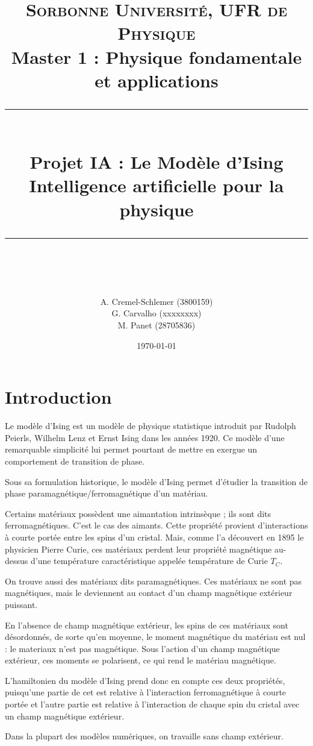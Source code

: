 \documentclass[11pt]{scrartcl} %
\title{	
	\normalfont\normalsize
	\large\textsc{Sorbonne Université, UFR de Physique}\\ %
	\vspace{2pt} %
	\normalsize Master 1 : Physique fondamentale et applications\\
	\vspace{25pt} %
	\rule{\linewidth}{0.5pt}\\ %
	\vspace{20pt} %
	{\huge Projet IA : Le Modèle d'Ising}\\ %
	\vspace{2pt} %
	{Intelligence artificielle pour la physique}\\
	\vspace{12pt} %
	\rule{\linewidth}{2pt}\\ %
	\vspace{12pt} %
}
\author{\LARGE A. Cremel-Schlemer \large (3800159) \\ \LARGE G. Carvalho \large (xxxxxxxx) \\ \LARGE M. Panet \large (28705836)} %
\date{\normalsize\today} %
\begin{document}
\maketitle %
\tableofcontents %

\newpage

\section*{Introduction}

Le modèle d'Ising est un modèle de physique statistique introduit par Rudolph Peierls, Wilhelm Lenz et Ernst Ising dans les années 1920. Ce modèle d'une remarquable simplicité lui permet pourtant de mettre en exergue un comportement de transition de phase.

\vspace{2mm}

Sous sa formulation historique, le modèle d'Ising permet d'étudier la transition de phase paramagnétique/ferromagnétique d'un matériau. 

Certains matériaux possèdent une aimantation intrinsèque ; ils sont dits ferromagnétiques. C'est le cas des aimants. Cette propriété provient d'interactions à courte portée entre les spins d'un cristal. Mais, comme l'a découvert en 1895 le physicien Pierre Curie, ces matériaux perdent leur propriété magnétique au-dessus d'une température caractéristique appelée température de Curie $T_C$.

On trouve aussi des matériaux dits paramagnétiques. Ces matériaux ne sont pas magnétiques, mais le deviennent au contact d'un champ magnétique extérieur puissant.

En l'absence de champ magnétique extérieur, les spins de ces matériaux sont désordonnés, de sorte qu'en moyenne, le moment magnétique du matériau est nul : le materiaux n'est pas magnétique. Sous l'action d'un champ magnétique extérieur, ces moments se polarisent, ce qui rend le matériau magnétique.

\vspace{2mm}

L'hamiltonien du modèle d'Ising prend donc en compte ces deux propriétés, puisqu'une partie de cet est relative à l'interaction ferromagnétique à courte portée et l'autre partie est relative à l'interaction de chaque spin du cristal avec un champ magnétique extérieur. 

Dans la plupart des modèles numériques, on travaille sans champ extérieur.
\end{document}
